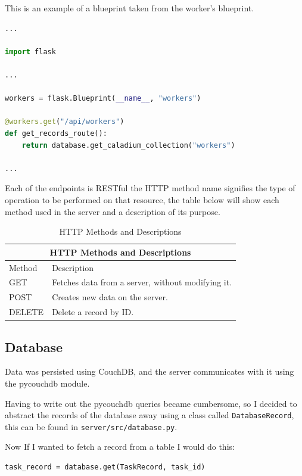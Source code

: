 This is an example of a blueprint taken from the worker's blueprint.
\begin{lstlisting}[language=python]
...

import flask

...

workers = flask.Blueprint(__name__, "workers")

@workers.get("/api/workers")
def get_records_route():
    return database.get_caladium_collection("workers")

...
\end{lstlisting}

Each of the endpoints is RESTful the HTTP method name signifies
the type of operation to be performed on that resource,
the table below will show each method used in the server
and a description of its purpose.

\begin{table}
    \centering
    \begin{tabular}{|p{2cm}|p{6cm}|}
        \hline
        \multicolumn{2}{|c|}{HTTP Methods and Descriptions} \\
        \hline
        Method & Description \\
        \hline
        GET & Fetches data from a server, without modifying it. \\
        \hline
        POST & Creates new data on the server. \\
        \hline
        DELETE & Delete a record by ID. \\
        \hline
    \end{tabular}
    \caption{HTTP Methods and Descriptions}
    \label{table:httpMethods}
\end{table}

\subsection{Database}
Data was persisted using CouchDB,
and the server communicates with it using the pycouchdb module.

Having to write out the pycouchdb queries became cumbersome,
so I decided to abstract the records of the database away using a class called
\texttt{DatabaseRecord}, this can be found in \texttt{server/src/database.py}.

Now If I wanted to fetch a record from a table I would do this:
\begin{lstlisting}
task_record = database.get(TaskRecord, task_id)
\end{lstlisting}

